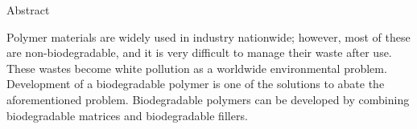 \clearpage
\thispagestyle{empty}


\begin{center}
	
	
	{\fontsize{20pt}{24pt}\selectfont
		\ThesisTitle \par}
	
	\vspace{1.6cm}
	
	{\fontsize{14pt}{16pt}\selectfont
		\ThesisAuthor \par}
	
	\vspace{0.4cm}
	
	{\fontsize{14pt}{24pt}
		\selectfont
		\ThesisSchool \par
		\ThesisUniversity \par
	}
	
	\vspace{1.0cm}
	
	{\fontsize{14pt}{16pt}\selectfont Abstract\par}
	
\end{center}


\noindent
Polymer materials are widely used in industry nationwide; however, most of these are non-biodegradable, and it is very difficult to manage their waste after use. These wastes become white pollution as a worldwide environmental problem. Development of a biodegradable polymer is one of the solutions to abate the aforementioned problem. Biodegradable polymers can be developed by combining biodegradable matrices and biodegradable fillers.

